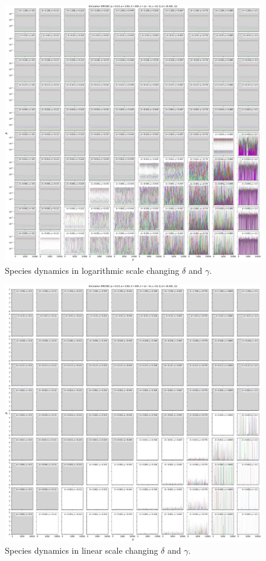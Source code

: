 \documentclass[11pt,a4paper,fleqn]{scrartcl}
\begin{document}
\begin{figure}[H]
    \centering
    \includegraphics[width=\linewidth]{DeltaGamma/10SpeciesFP.pdf}
    \caption{Species dynamics in logarithmic scale changing $\delta$ and $\gamma$.}
\end{figure}

\clearpage

\begin{figure}[H]
    \centering
    \includegraphics[width=\linewidth]{DeltaGamma/10SpeciesFPLinear.pdf}
    \caption{Species dynamics in linear scale changing $\delta$ and $\gamma$.}
\end{figure}
\end{document}
